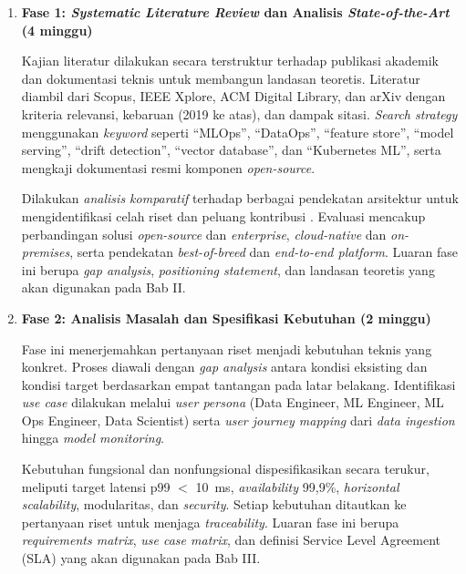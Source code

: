 \vspace{0.5em}
\begin{enumerate}
    \item \textbf{Fase 1: \textit{Systematic Literature Review} dan Analisis \textit{State-of-the-Art} (4 minggu)}
    
    Kajian literatur dilakukan secara terstruktur terhadap publikasi akademik dan dokumentasi teknis untuk membangun landasan teoretis. Literatur diambil dari Scopus, IEEE Xplore, ACM Digital Library, dan arXiv dengan kriteria relevansi, kebaruan (2019 ke atas), dan dampak sitasi. \textit{Search strategy} menggunakan \textit{keyword} seperti ``MLOps'', ``DataOps'', ``feature store'', ``model serving'', ``drift detection'', ``vector database'', dan ``Kubernetes ML'', serta mengkaji dokumentasi resmi komponen \textit{open-source}. 
    
    \vspace{0.5em}

    Dilakukan \textit{analisis komparatif} terhadap berbagai pendekatan arsitektur \autocite{najafabadi2024analysis} untuk mengidentifikasi celah riset dan peluang kontribusi \autocite{paleyes2022challenges}. Evaluasi mencakup perbandingan solusi \textit{open-source} dan \textit{enterprise}, \textit{cloud-native} dan \textit{on-premises}, serta pendekatan \textit{best-of-breed} dan \textit{end-to-end platform}. Luaran fase ini berupa \textit{gap analysis}, \textit{positioning statement}, dan landasan teoretis yang akan digunakan pada Bab II.
    
    \vspace{0.5em}

    \item \textbf{Fase 2: Analisis Masalah dan Spesifikasi Kebutuhan (2 minggu)}
    
    Fase ini menerjemahkan pertanyaan riset menjadi kebutuhan teknis yang konkret. Proses diawali dengan \textit{gap analysis} antara kondisi eksisting dan kondisi target berdasarkan empat tantangan pada latar belakang. Identifikasi \textit{use case} dilakukan melalui \textit{user persona} (Data Engineer, ML Engineer, ML Ops Engineer, Data Scientist) serta \textit{user journey mapping} dari \textit{data ingestion} hingga \textit{model monitoring}.
    
    \vspace{0.5em}
    
    Kebutuhan fungsional dan nonfungsional dispesifikasikan secara terukur, meliputi target latensi p99 $<$ 10~ms, \textit{availability} 99{,}9\%, \textit{horizontal scalability}, modularitas, dan \textit{security}. Setiap kebutuhan ditautkan ke pertanyaan riset untuk menjaga \textit{traceability}. Luaran fase ini berupa \textit{requirements matrix}, \textit{use case matrix}, dan definisi Service Level Agreement (SLA) yang akan digunakan pada Bab III.
    

\end{enumerate}
